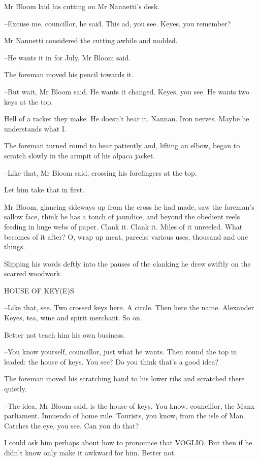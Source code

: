 Mr Bloom laid his cutting on Mr Nannetti's desk.

--Excuse me, councillor, he said. This ad, you see. Keyes, you remember?

Mr Nannetti considered the cutting awhile and nodded.

--He wants it in for July, Mr Bloom said.

The foreman moved his pencil towards it.

--But wait, Mr Bloom said. He wants it changed. Keyes, you see. He wants
two keys at the top.

Hell of a racket they make. He doesn't hear it. Nannan. Iron nerves.
Maybe he understands what I.

The foreman turned round to hear patiently and, lifting an elbow,
began to scratch slowly in the armpit of his alpaca jacket.

--Like that, Mr Bloom said, crossing his forefingers at the top.

Let him take that in first.

Mr Bloom, glancing sideways up from the cross he had made, saw the
foreman's sallow face, think he has a touch of jaundice, and beyond the
obedient reels feeding in huge webs of paper. Clank it. Clank it. Miles of
it unreeled. What becomes of it after? O, wrap up meat, parcels: various
uses, thousand and one things.

Slipping his words deftly into the pauses of the clanking he drew
swiftly on the scarred woodwork.


    HOUSE OF KEY(E)S


--Like that, see. Two crossed keys here. A circle. Then here the name.
Alexander Keyes, tea, wine and spirit merchant. So on.

Better not teach him his own business.

--You know yourself, councillor, just what he wants. Then round the top
in leaded: the house of keys. You see? Do you think that's a good idea?

The foreman moved his scratching hand to his lower ribs and scratched
there quietly.

--The idea, Mr Bloom said, is the house of keys. You know, councillor,
the Manx parliament. Innuendo of home rule. Tourists, you know, from the
isle of Man. Catches the eye, you see. Can you do that?

I could ask him perhaps about how to pronounce that VOGLIO. But
then if he didn't know only make it awkward for him. Better not.

